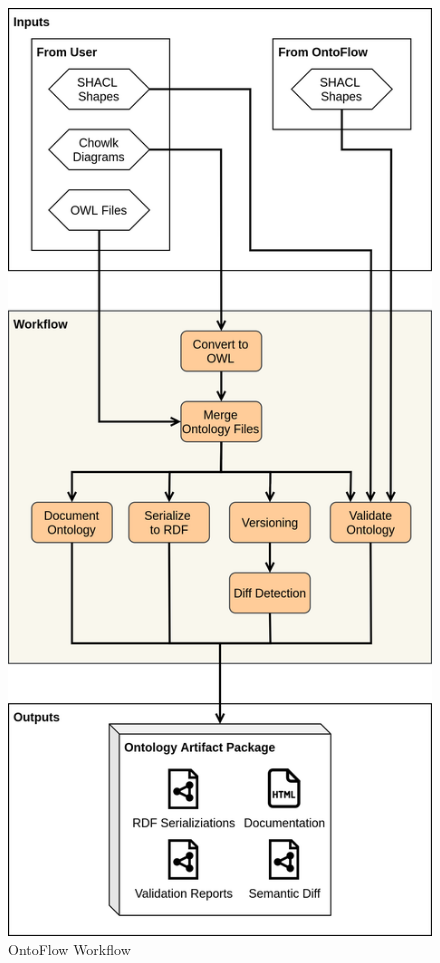 \documentclass[sigconf]{acmart}
\begin{document}
\begin{figure}[h]
  \centering
  \includegraphics[scale = 0.4]{workflow.png}
  \caption{OntoFlow Workflow}
  \label{fig:workflow}
\end{figure}
\end{document}
